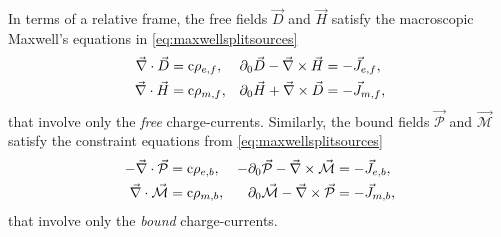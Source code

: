 \documentclass[1p,sort&compress]{elsarticle}
\numberwithin{equation}{section}
\newcommand{\rv}[1]{\vec{#1}}
\newcommand{\cc}{{\rm c}}
\begin{document}
In terms of a relative frame, the free fields $\rv{D}$ and $\rv{H}$ satisfy the macroscopic Maxwell's equations in \eqref{eq:maxwellsplitsources}
\begin{align}
  \rv{\nabla}\cdot\rv{D} &= \cc\rho_{e,f}, & \partial_0 \rv{D} - \rv{\nabla}\times\rv{H} &= - \rv{J}_{e,f}, \\
  \rv{\nabla}\cdot\rv{H} &= \cc\rho_{m,f}, & \partial_0 \rv{H} + \rv{\nabla}\times\rv{D} &= - \rv{J}_{m,f}, \nonumber
\end{align}
that involve only the \emph{free} charge-currents.  Similarly, the bound fields $\rv{\mathcal{P}}$ and $\rv{\mathcal{M}}$ satisfy the constraint equations from \eqref{eq:maxwellsplitsources}
\begin{align}\label{eq:maxwellsplitsources2}
  -\rv{\nabla}\cdot\rv{\mathcal{P}} &= \cc\rho_{e,b}, & -\partial_0 \rv{\mathcal{P}} - \rv{\nabla}\times\rv{\mathcal{M}} &= - \rv{J}_{e,b}, \\
  \rv{\nabla}\cdot\rv{\mathcal{M}} &= \cc\rho_{m,b}, & \partial_0 \rv{\mathcal{M}} - \rv{\nabla}\times\rv{\mathcal{P}} &= - \rv{J}_{m,b}, \nonumber
\end{align}
that involve only the \emph{bound} charge-currents.  
\end{document}
